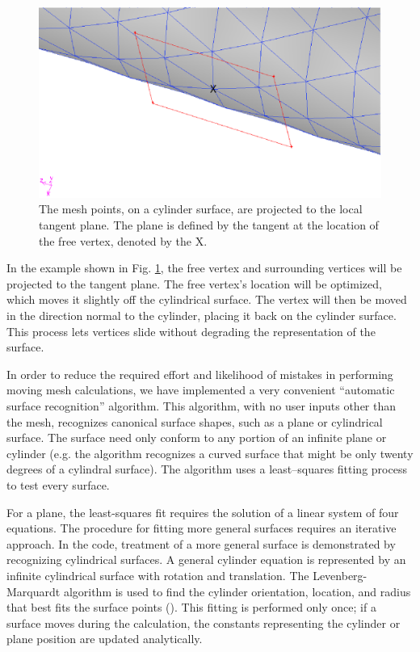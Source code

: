 \documentclass[a4paper,12pt,notitlepage]{article}
\begin{document}
\begin{figure}
  \centering
  \includegraphics[height=.4\textwidth]{Images/curved_surface.eps}
  \caption{The mesh points, on a cylinder surface, are projected to
    the local tangent plane.  The plane is defined by the tangent at the location of the free vertex, denoted by the X.}
  \label{fig:curved_surface}
\end{figure}

In the example shown in Fig. \ref{fig:curved_surface}, the free vertex and surrounding vertices will be projected to the tangent plane.  The free vertex's location will be optimized, which moves it slightly off the cylindrical surface.  The vertex will then be moved in the direction normal to the cylinder, placing it back on the cylinder surface.  This process lets vertices slide without degrading the representation of the surface.

In order to reduce the required effort and likelihood of mistakes in
performing moving mesh calculations, we have implemented a very
convenient ``automatic surface recognition'' algorithm.  This
algorithm, with no user inputs other than the mesh, recognizes
canonical surface shapes, such as a plane or cylindrical surface. The
surface need only conform to any portion of an infinite plane or
cylinder (e.g. the algorithm recognizes a curved surface that might be
only twenty degrees of a cylindral surface).  The algorithm uses a
least--squares fitting process to test every surface.

For a plane, the least-squares fit requires the solution of a linear system of four equations.  The procedure for fitting more general surfaces requires an iterative approach.  In the code, treatment of a more general surface is demonstrated by recognizing cylindrical surfaces.  A general cylinder equation is represented by an infinite cylindrical surface with rotation and translation.  The Levenberg-Marquardt algorithm is used to find the cylinder orientation, location, and radius that best fits the surface points (\cite{SLATEC:Vandervender}).  This fitting is performed only once; if a surface moves during the calculation, the constants representing the cylinder or plane position are updated analytically.
\end{document}
